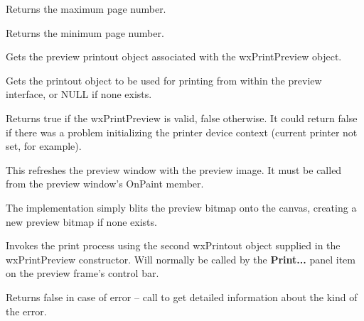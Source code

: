
Returns the maximum page number.


\label{wxprintpreviewgetminpage}


Returns the minimum page number.


\label{wxprintpreviewgetprintout}


Gets the preview printout object associated with the wxPrintPreview object.


\label{wxprintpreviewgetprintoutforprinting}


Gets the printout object to be used for printing from within the preview interface,
or NULL if none exists.


\label{wxprintpreviewok}


Returns true if the wxPrintPreview is valid, false otherwise. It could return false if there was a
problem initializing the printer device context (current printer not set, for example).


\label{wxprintpreviewpaintpage}


This refreshes the preview window with the preview image.
It must be called from the preview window's OnPaint member.

The implementation simply blits the preview bitmap onto
the canvas, creating a new preview bitmap if none exists.


\label{wxprintpreviewprint}


Invokes the print process using the second wxPrintout object
supplied in the wxPrintPreview constructor.
Will normally be called by the {\bf Print...} panel item on the
preview frame's control bar.

Returns false in case of error -- call
 to get detailed
information about the kind of the error.


